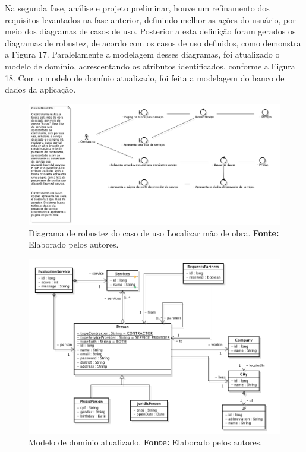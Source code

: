 \par Na segunda fase, análise e projeto preliminar, houve um refinamento dos requisitos levantados na fase anterior, definindo melhor as ações do usuário, por meio dos diagramas de casos de uso. Posterior a esta definição foram gerados os diagramas de robustez, de acordo com os casos de uso definidos, como demonstra a Figura 17. Paralelamente a modelagem desses diagramas, foi atualizado o modelo de domínio, acrescentando os atributos identificados, conforme a Figura 18. Com o modelo de domínio atualizado, foi feita a modelagem do banco de dados da aplicação.

\begin{figure}[h!]
	\centerline{\includegraphics[scale=0.35]{./imagens/robustez.png}}
	\caption[Diagrama de robustez do caso de uso Localizar mão de obra]
	{Diagrama de robustez do caso de uso Localizar mão de obra. \textbf{Fonte:} Elaborado pelos autores.}
	\label{fig:exemplo1}
\end{figure}

\begin{figure}[h!]
	\centerline{\includegraphics[scale=0.6]{./imagens/modelo-dominio-com-atributos.png}}
	\caption[Modelo de domínio atualizado]
	{Modelo de domínio atualizado. \textbf{Fonte:} Elaborado pelos autores.}
	\label{fig:exemplo1}
\end{figure} 

